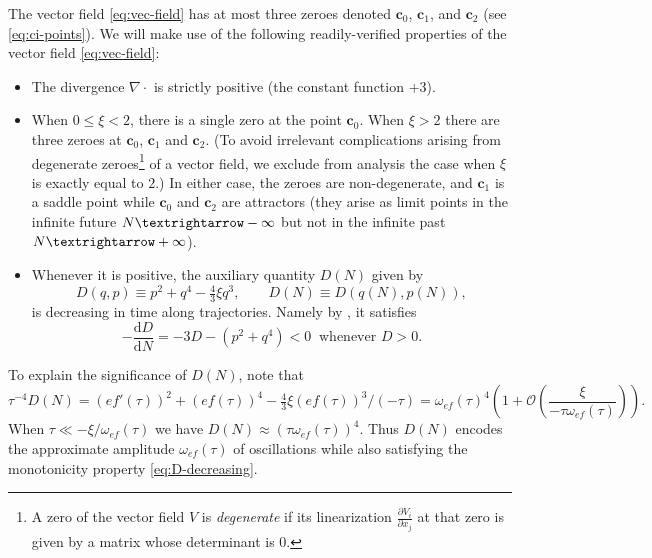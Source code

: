The vector field \eqref{eq:vec-field} has at most three zeroes denoted $\mathbf{c}_{0}$, $\mathbf{c}_{1}$, and $\mathbf{c}_{2}$ (see \eqref{eq:ci-points}). We will make use of the following readily-verified properties of the vector field \eqref{eq:vec-field}:
\begin{itemize}
\item The divergence $\nabla\cdot$ is strictly positive (the constant function $+3$). 
\item When $0\leq\xi<2$, there is a single zero at the point $\mathbf{c}_{0}$. When $\xi>2$ there are three zeroes at $\mathbf{c}_{0}$, $\mathbf{c}_{1}$ and $\mathbf{c}_{2}$. (To avoid irrelevant complications arising from degenerate zeroes\footnote{A zero of the vector field $V$ is \emph{degenerate} if its linearization $\frac{\partial V_{i}}{\partial x_{j}}$ at that zero is given by a matrix whose determinant is $0$.} of a vector field, we exclude from analysis the case when $\xi$ is exactly equal to $2$.) In either case, the zeroes are non-degenerate, and $\mathbf{c}_{1}$ is a saddle point while $\mathbf{c}_{0}$ and $\mathbf{c}_{2}$ are attractors (they arise as limit points in the infinite future $N\textrightarrow-\infty$ but not in the infinite past $N\textrightarrow+\infty$). 
\item Whenever it is positive, the auxiliary quantity $D(N)$ given by 
\begin{equation}
D(q,p)\equiv p^{2}+q^{4}-\tfrac{4}{3}\xi q^{3},\qquad D(N)\equiv D(q(N),p(N)),\label{eq:def-D}
\end{equation}
 is decreasing in time along trajectories. Namely by , it satisfies 
\begin{equation}
-\frac{\mathrm{d}D}{\mathrm{d}N}=-3D-(p^{2}+q^{4})<0\ \textrm{ whenever }D>0.\label{eq:D-decreasing}
\end{equation}
\end{itemize}
To explain the significance of $D(N)$, note that 
\begin{equation}
\tau^{-4}D(N)=\left(ef'(\tau)\right)^{2}+\left(ef(\tau)\right)^{4}-\tfrac{4}{3}\xi(ef(\tau))^{3}/(-\tau)=\omega_{ef}(\tau)^{4}\left(1+\mathcal{O}\left(\frac{\xi}{-\tau\omega_{ef}(\tau)}\right)\right).\label{eq:DN-asymptotic}
\end{equation}
 When $\tau\ll-\xi/\omega_{ef}(\tau)$ we have $D(N)\approx(\tau\omega_{ef}(\tau))^{4}$. Thus $D(N)$ encodes the approximate amplitude $\omega_{ef}(\tau)$ of oscillations while also satisfying the monotonicity property \eqref{eq:D-decreasing}.  
